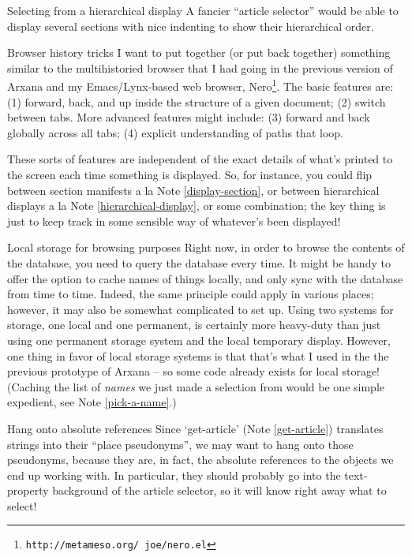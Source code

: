 \begin{notate}{Selecting from a hierarchical display} \label{hierarchical-display}
A fancier ``article selector'' would be able to display
several sections with nice indenting to show their
hierarchical order.
\end{notate}

\begin{notate}{Browser history tricks} \label{history-tricks}
I want to put together (or put back together) something
similar to the multihistoried browser that I had going in
the previous version of Arxana and my Emacs/Lynx-based web
browser, Nero\footnote{{\tt http://metameso.org/~joe/nero.el}}.
The basic features are:
(1) forward, back, and up inside the structure of a given
document; (2) switch between tabs.  More advanced features
might include: (3) forward and back globally across all
tabs; (4) explicit understanding of paths that loop.

These sorts of features are independent of the exact
details of what's printed to the screen each time
something is displayed.  So, for instance, you could flip
between section manifests a la Note \ref{display-section},
or between hierarchical displays a la Note
\ref{hierarchical-display}, or some combination; the key
thing is just to keep track in some sensible way of
whatever's been displayed!
\end{notate}

\begin{notate}{Local storage for browsing purposes} \label{local-storage}
Right now, in order to browse the contents of the
database, you need to query the database every time.  It
might be handy to offer the option to cache names of
things locally, and only sync with the database from time
to time.  Indeed, the same principle could apply in
various places; however, it may also be somewhat
complicated to set up.  Using two systems for storage, one
local and one permanent, is certainly more heavy-duty than
just using one permanent storage system and the local
temporary display.  However, one thing in favor of local
storage systems is that that's what I used in the the
previous prototype of Arxana -- so some code already
exists for local storage!  (Caching the list of
\emph{names} we just made a selection from would be one
simple expedient, see Note \ref{pick-a-name}.)
\end{notate}

\begin{notate}{Hang onto absolute references}
Since `get-article' (Note \ref{get-article}) translates
strings into their ``place pseudonyms'', we may want to
hang onto those pseudonyms, because they are, in fact, the
absolute references to the objects we end up working with.
In particular, they should probably go into the
text-property background of the article selector, so it
will know right away what to select!
\end{notate}

